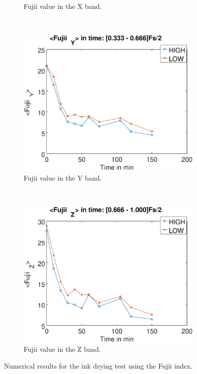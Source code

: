 \documentclass[review]{elsarticle}
\begin{document}
\begin{figure}[!h]
\begin{subfigure}[b]{0.475\textwidth}
	\caption{Fujii value in the X band.}
        \label{fig:fujiixink}
    \end{subfigure}
    ~\\ 
    \begin{subfigure}[b]{0.475\textwidth}
        \includegraphics[width=\textwidth]{fujii-bandy.eps}
	\caption{Fujii value in the Y band.}
        \label{fig:fujiiyink}
    \end{subfigure}
  ~
    \begin{subfigure}[b]{0.475\textwidth}
        \includegraphics[width=\textwidth]{fujii-bandz.eps}
	\caption{Fujii value in the Z band.}
        \label{fig:fujiizink}
    \end{subfigure}
    
\caption{Numerical results for the ink drying test using the Fujii index.}
\label{fig:numericalvsfujii}
\end{figure}
\end{document}
